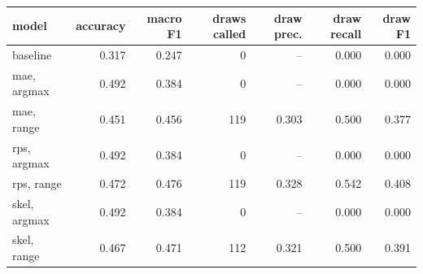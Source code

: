 
\begin{tabular}{lrrrrrr}
\toprule
model & accuracy & macro F1 & draws called & draw prec. & draw recall & draw F1\\
\midrule
baseline & 0.317 & 0.247 & 0 & -- & 0.000 & 0.000\\
mae, argmax & 0.492 & 0.384 & 0 & -- & 0.000 & 0.000\\
mae, range & 0.451 & 0.456 & 119 & 0.303 & 0.500 & 0.377\\
rps, argmax & 0.492 & 0.384 & 0 & -- & 0.000 & 0.000\\
rps, range & 0.472 & 0.476 & 119 & 0.328 & 0.542 & 0.408\\
skel, argmax & 0.492 & 0.384 & 0 & -- & 0.000 & 0.000\\
skel, range & 0.467 & 0.471 & 112 & 0.321 & 0.500 & 0.391\\
\bottomrule
\end{tabular}
